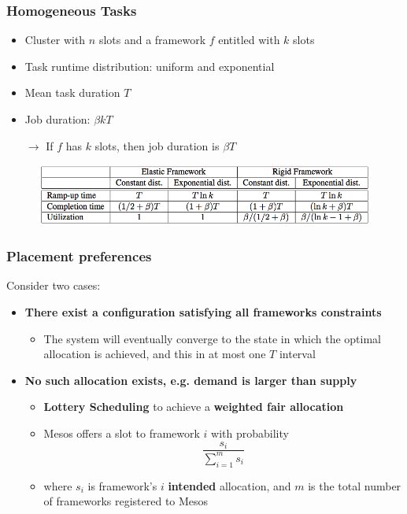 \begin{frame}
\frametitle{Homogeneous Tasks}
\begin{itemize}
	\item Cluster with $n$ slots and a framework $f$ entitled with $k$ slots
	\item Task runtime distribution: uniform and exponential
	\item Mean task duration $T$
	\item Job duration: $\beta k T$
	\item[$\to$] If $f$ has $k$ slots, then job duration is $\beta T$
\end{itemize}
\begin{figure}[h]
  \centering
  \includegraphics[scale=0.4]{./figures/mesos_model}
  \label{fig:mesos_arch_example}
\end{figure}
\end{frame}

\begin{frame}
\frametitle{Placement preferences}
Consider two cases:
\begin{itemize}
	\item {\bf There exist a configuration satisfying all frameworks constraints}
	\begin{itemize}
		\item The system will eventually converge to the state in which the optimal allocation is achieved, and this in at most one $T$ interval
	\end{itemize}
	\item {\bf No such allocation exists, e.g. demand is larger than supply}
	\begin{itemize}
		\item {\bf Lottery Scheduling} to achieve a {\bf weighted fair allocation}
		\item Mesos offers a slot to framework $i$ with probability 
		$$ \frac{s_i}{\sum_{i=1}^{m}s_i} $$
		\item where $s_i$ is framework's $i$ {\bf intended} allocation, and $m$ is the total number of frameworks registered to Mesos
	\end{itemize}
\end{itemize}
\end{frame}

